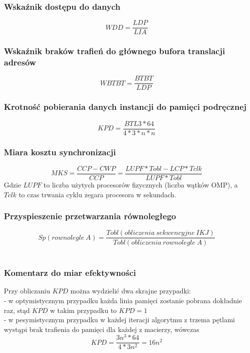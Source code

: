\documentclass[10pt,a4paper]{article}
\begin{document}
\subsubsection*{Wskaźnik dostępu do danych}
\begin{equation}
    WDD = \frac{LDP}{LIA}
\end{equation}
\subsubsection*{Wskaźnik braków trafień do głównego bufora translacji adresów}
\begin{equation}
    WBTBT = \frac{BTBT}{LDP}
\end{equation}
\subsubsection*{Krotność pobierania danych instancji do pamięci podręcznej}
\begin{equation}
    KPD = \frac{BTL3 * 64}{4 * 3 * n * n}
\end{equation}
\subsubsection*{Miara kosztu synchronizacji}
\begin{equation}
    MKS = \frac{CCP - CWP}{CCP} = \frac{LUPF * Tobl - LCP * Tclk}{LUPF * Tobl}
\end{equation}
Gdzie $LUPF$ to liczba użytych procesorów fizycznych (liczba wątków OMP), a $Tclk$ 
to czas trwania cyklu zegara procesora w sekundach.
\subsubsection*{Przyspieszenie przetwarzania równoległego}
\begin{equation}
    Sp(rownolegle\: A) = \frac{Tobl(obliczenia \: sekwencyjne \: IKJ)}{Tobl(obliczenia \: rownolegle \: A)}
\end{equation}
\\
\subsubsection*{Komentarz do miar efektywności}
Przy obliczaniu $KPD$ można wydzielić dwa skrajne przypadki: \\
- w optymistycznym przypadku każda linia pamięci zostanie pobrana dokładnie raz,
stąd $KPD$ w takim przypadku to $KPD = 1$\\
- w pesymistycznym przypadku w każdej iteracji algorytmu z trzema pętlami wystąpi
brak trafienia do pamięci dla każdej z macierzy, wówczas $$KPD = \frac{3n^3 * 64}{4 * 3n^2}
= 16 n^2$$
\end{document}
